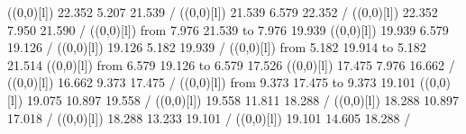 {{}%
%
%
\linethickness=1pt
\setplotsymbol ({\makebox(0,0)[l]{\tencirc{}}})
{\color[rgb]{0,0,1} 22.352  5.207 21.539 /
}%
%
%
\linethickness=1pt
\setplotsymbol ({\makebox(0,0)[l]{\tencirc{}}})
{\color[rgb]{0,0,1} 21.539  6.579 22.352 /
}%
%
%
\linethickness=1pt
\setplotsymbol ({\makebox(0,0)[l]{\tencirc{}}})
{\color[rgb]{0,0,1} 22.352  7.950 21.590 /
}%
%
%
\linethickness=1pt
\setplotsymbol ({\makebox(0,0)[l]{\tencirc{}}})
{\color[rgb]{0,0,1}\putrule from  7.976 21.539 to  7.976 19.939
}%
%
%
\linethickness=1pt
\setplotsymbol ({\makebox(0,0)[l]{\tencirc{}}})
{\color[rgb]{0,0,1} 19.939  6.579 19.126 /
}%
%
%
\linethickness=1pt
\setplotsymbol ({\makebox(0,0)[l]{\tencirc{}}})
{\color[rgb]{0,0,1} 19.126  5.182 19.939 /
}%
%
%
\linethickness=1pt
\setplotsymbol ({\makebox(0,0)[l]{\tencirc{}}})
{\color[rgb]{1,0,0}\putrule from  5.182 19.914 to  5.182 21.514
}%
%
%
\linethickness=1pt
\setplotsymbol ({\makebox(0,0)[l]{\tencirc{}}})
{\color[rgb]{0,0,1}\putrule from  6.579 19.126 to  6.579 17.526
}%
%
%
\linethickness=1pt
\setplotsymbol ({\makebox(0,0)[l]{\tencirc{}}})
{\color[rgb]{0,0,1} 17.475  7.976 16.662 /
}%
%
%
\linethickness=1pt
\setplotsymbol ({\makebox(0,0)[l]{\tencirc{}}})
{\color[rgb]{0,0,1} 16.662  9.373 17.475 /
}%
%
%
\linethickness=1pt
\setplotsymbol ({\makebox(0,0)[l]{\tencirc{}}})
{\color[rgb]{0,0,1}\putrule from  9.373 17.475 to  9.373 19.101
}%
%
%
\linethickness=1pt
\setplotsymbol ({\makebox(0,0)[l]{\tencirc{}}})
{\color[rgb]{0,0,1} 19.075 10.897 19.558 /
}%
%
%
\linethickness=1pt
\setplotsymbol ({\makebox(0,0)[l]{\tencirc{}}})
{\color[rgb]{0,0,1} 19.558 11.811 18.288 /
}%
%
%
\linethickness=1pt
\setplotsymbol ({\makebox(0,0)[l]{\tencirc{}}})
{\color[rgb]{0,0,1} 18.288 10.897 17.018 /
}%
%
%
\linethickness=1pt
\setplotsymbol ({\makebox(0,0)[l]{\tencirc{}}})
{\color[rgb]{0,0,1} 18.288 13.233 19.101 /
}%
%
%
\linethickness=1pt
\setplotsymbol ({\makebox(0,0)[l]{\tencirc{}}})
{\color[rgb]{0,0,1} 19.101 14.605 18.288 /
}}
